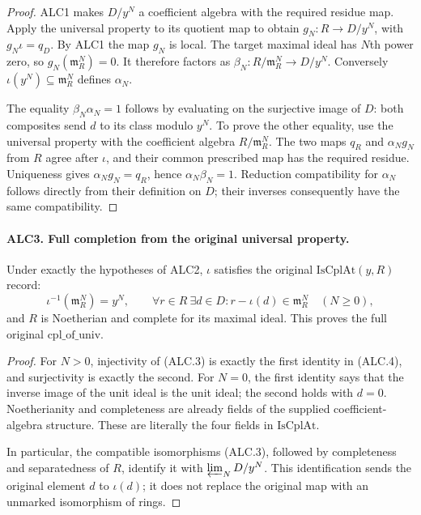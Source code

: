 \begin{proof}
ALC1 makes \(D/y^N\) a coefficient algebra with the required
residue map.  Apply the universal property to its quotient map
to obtain \(g_N:R\to D/y^N\), with
\(g_N\iota=q_D\).  By ALC1 the map \(g_N\) is local.
The target maximal ideal has \(N\)th power zero, so
\(g_N(\mathfrak m_R^N)=0\).  It therefore factors as
\(\beta_N:R/\mathfrak m_R^N\to D/y^N\).
Conversely \(\iota(y^N)\subseteq\mathfrak m_R^N\) defines
\(\alpha_N\).

The equality \(\beta_N\alpha_N=1\) follows by evaluating on
the surjective image of \(D\): both composites send \(d\)
to its class modulo \(y^N\).  To prove the other equality,
use the universal property with the coefficient algebra
\(R/\mathfrak m_R^N\).  The two maps
\(q_R\) and \(\alpha_Ng_N\) from \(R\) agree after
\(\iota\), and their common prescribed map has the required
residue.  Uniqueness gives \(\alpha_Ng_N=q_R\), hence
\(\alpha_N\beta_N=1\).  Reduction compatibility for
\(\alpha_N\) follows directly from their definition on \(D\);
their inverses consequently have the same compatibility.
\end{proof}

\paragraph{ALC3. Full completion from the original universal property.}
\label{claim:ALC3}
Under exactly the hypotheses of ALC2, \(\iota\) satisfies the
original \(\mathrm{IsCplAt}(y,R)\) record:
\[
 \iota^{-1}(\mathfrak m_R^N)=y^N,
 \qquad
 \forall r\in R\ \exists d\in D:
           r-\iota(d)\in\mathfrak m_R^N
                     \quad(N\ge0),                  \tag{ALC.4}
\]
and \(R\) is Noetherian and complete for its maximal ideal.
This proves the full original \(\mathrm{cpl\_of\_univ}\).

\begin{proof}
For \(N>0\), injectivity of (ALC.3) is exactly the first
identity in (ALC.4), and surjectivity is exactly the second.
For \(N=0\), the first identity says that the inverse image
of the unit ideal is the unit ideal; the second holds with
\(d=0\).  Noetherianity and completeness are already fields
of the supplied coefficient-algebra structure.  These are
literally the four fields in \(\mathrm{IsCplAt}\).

In particular, the compatible isomorphisms (ALC.3), followed
by completeness and separatedness of \(R\), identify it with
\(\varprojlim_N D/y^N\).  This identification sends the
original element \(d\) to \(\iota(d)\); it does not replace
the original map with an unmarked isomorphism of rings.
\end{proof}

